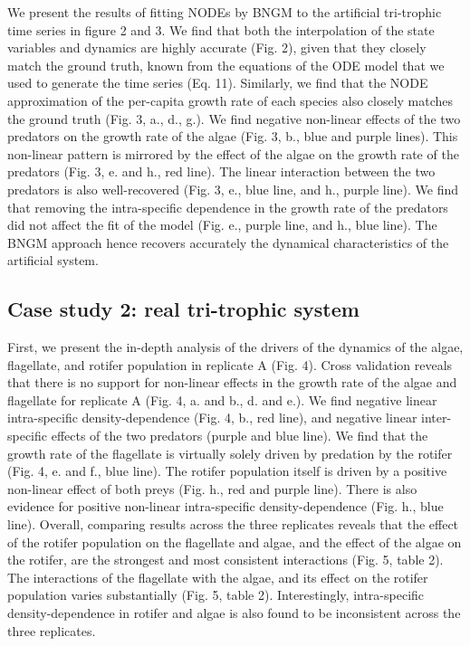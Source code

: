 \documentclass[11pt, oneside]{article}
\begin{document}
We present the results of fitting NODEs by BNGM to the artificial tri-trophic time series in figure 2 and 3.
We find that both the interpolation of the state variables and dynamics are highly accurate (Fig. 2), given that they closely match the ground truth, known from the equations of the ODE model that we used to generate the time series (Eq. 11).
Similarly, we find that the NODE approximation of the per-capita growth rate of each species also closely matches the ground truth (Fig. 3, a., d., g.). 
We find negative non-linear effects of the two predators on the growth rate of the algae (Fig. 3, b., blue and purple lines).
This non-linear pattern is mirrored by the effect of the algae on the growth rate of the predators (Fig. 3, e. and h., red line).
The linear interaction between the two predators is also well-recovered (Fig. 3, e., blue line, and h., purple line).
We find that removing the intra-specific dependence in the growth rate of the predators did not affect the fit of the model (Fig. e., purple line, and h., blue line).
The BNGM approach hence recovers accurately the dynamical characteristics of the artificial system.

\subsection{Case study 2: real tri-trophic system}

First, we present the in-depth analysis of the drivers of the dynamics of the algae, flagellate, and rotifer population in replicate A (Fig. 4).
Cross validation reveals that there is no support for non-linear effects in the growth rate of the algae and flagellate for replicate A (Fig. 4, a. and b., d. and e.). 
We find negative linear intra-specific density-dependence (Fig. 4, b., red line), and negative linear inter-specific effects of the two predators (purple and blue line).
We find that the growth rate of the flagellate is virtually solely driven by predation by the rotifer (Fig. 4, e. and f., blue line).
The rotifer population itself is driven by a positive non-linear effect of both preys (Fig. h., red and purple line).
There is also evidence for positive non-linear intra-specific density-dependence (Fig. h., blue line).
Overall, comparing results across the three replicates reveals that the effect of the rotifer population on the flagellate and algae, and the effect of the algae on the rotifer, are the strongest and most consistent interactions (Fig. 5, table 2).
The interactions of the flagellate with the algae, and its effect on the rotifer population varies substantially (Fig. 5, table 2). 
Interestingly, intra-specific density-dependence in rotifer and algae is also found to be inconsistent across the three replicates.
\end{document}
